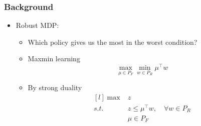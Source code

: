 \documentclass[aspectratio=169]{beamer}
\begin{document}
\begin{frame}
	\frametitle{Background}
	\begin{itemize}
		\item Robust MDP:
		\begin{itemize}
			\item Which policy gives us the most in the worst condition?
			\item Maxmin learning
			\[
				\max_{\mu \in P_F} \min_{w \in P_R} \mu^\top w 
			\]
			\item By strong duality
			\[
				\begin{matrix*}[l]
					\max & z \\
					s.t. & z \leq \mu^\top w, \quad \forall w \in P_R \\
					 	 & \mu \in P_F
				\end{matrix*}
			\]
		\end{itemize}
	\end{itemize}
\end{frame}
\end{document}
